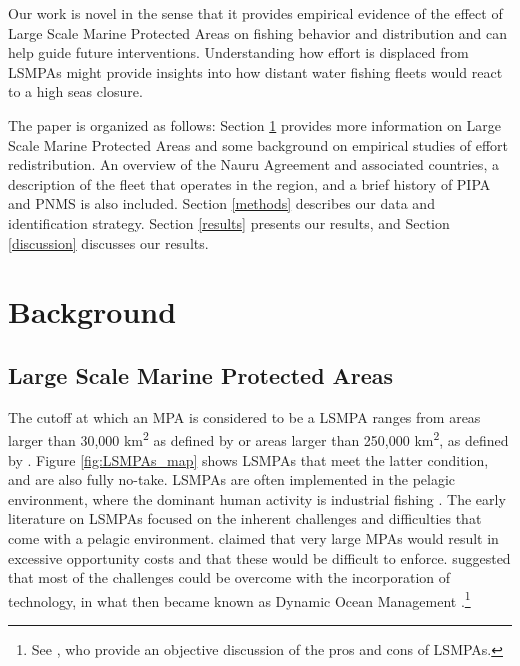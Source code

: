 \documentclass[11pt,english]{article}
\begin{document}
Our work is novel in the sense that it provides empirical evidence of
the effect of Large Scale Marine Protected Areas on fishing behavior and
distribution and can help guide future interventions. Understanding how
effort is displaced from LSMPAs might provide insights into how distant water fishing fleets would react to a high seas closure.

The paper is organized as follows: Section \ref{background} provides more
information on Large Scale Marine Protected Areas and some background on
empirical studies of effort redistribution. An overview of the Nauru
Agreement and associated countries, a description of the fleet that
operates in the region, and a brief history of PIPA and PNMS is also included.
Section \ref{methods} describes our data and identification strategy.
Section \ref{results} presents our results, and Section \ref{discussion}
discusses our
results.

\section{Background}\label{background}

\hypertarget{large-scale-marine-protected-areas}{%
\subsection{Large Scale Marine Protected
Areas}\label{large-scale-marine-protected-areas}}

The cutoff at which an MPA is considered to be a LSMPA ranges from areas
larger than 30,000 km\textsuperscript{2} as defined by
\citet{desanto_2013} or areas larger than 250,000 km\textsuperscript{2},
as defined by \citep{toonen_2013}. Figure \ref{fig:LSMPAs_map} shows
LSMPAs that meet the latter condition, and are also fully no-take. LSMPAs are often
implemented in the pelagic environment, where the dominant human
activity is industrial fishing \citep{gray_2017,kroodsma_2018}. The
early literature on LSMPAs focused on the inherent challenges and
difficulties that come with a pelagic environment. \citet{kaplan_2010}
claimed that very large MPAs would result in excessive opportunity costs
and that these would be difficult to enforce. \citet{game_2009}
suggested that most of the challenges could be overcome with the
incorporation of technology, in what then became known as Dynamic Ocean
Management \citep{maxwell_2015}.\footnote{See \citet{singleton_2014}, who provide an objective discussion of the pros and cons of LSMPAs.} 
\end{document}

